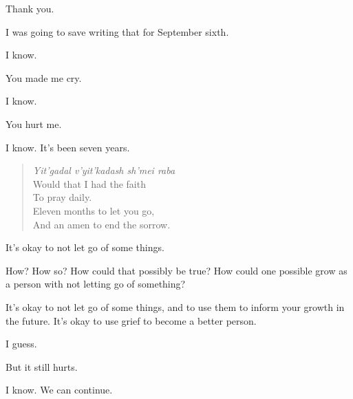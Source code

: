 \vfill

\begin{center}
\end{center}
\newpage

\begin{ally}
Thank you.
\end{ally}
I was going to save writing that for September sixth.

\begin{ally}
I know.
\end{ally}
You made me cry.

\begin{ally}
I know.
\end{ally}
You hurt me.

\begin{ally}
I know. It's been seven years.
\end{ally}

\begin{verse}
  \emph{Yit'gadal v'yit'kadash sh'mei raba}\\
  Would that I had the faith\\
  To pray daily.\\
  Eleven months to let you go,\\
  And an amen to end the sorrow.
\end{verse}

\begin{ally}
It's okay to not let go of some things.
\end{ally}
How? How so? How could that possibly be true? How could one possible grow as a person with not letting go of something?

\begin{ally}
It's okay to not let go of some things, and to use them to inform your growth in the future. It's okay to use grief to become a better person.
\end{ally}
I guess.

But it still hurts.

\begin{ally}
I know. We can continue.
\end{ally}
\newpage
